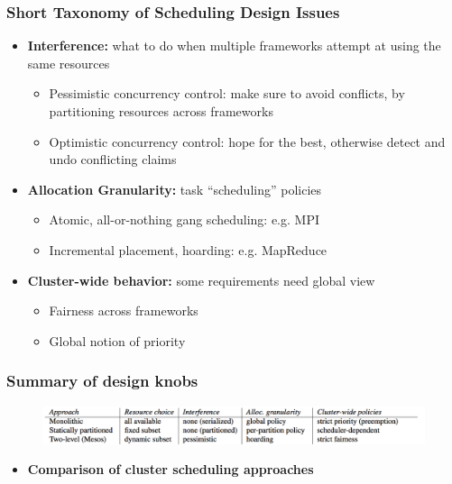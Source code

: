 \begin{frame}\frametitle{Short Taxonomy of Scheduling Design Issues}
\begin{itemize}
	\item {\bf Interference:} what to do when multiple frameworks attempt at using the same resources
	\begin{itemize}
		\item Pessimistic concurrency control: make sure to avoid conflicts, by partitioning resources across frameworks
		\item Optimistic concurrency control: hope for the best, otherwise detect and undo conflicting claims
	\end{itemize}

\vspace{20pt}

	\item {\bf Allocation Granularity: } task ``scheduling'' policies
	\begin{itemize}
		\item Atomic, all-or-nothing gang scheduling: e.g. MPI
		\item Incremental placement, hoarding: e.g. MapReduce
	\end{itemize}

\vspace{20pt}

	\item {\bf Cluster-wide behavior: } some requirements need global view
	\begin{itemize}
		\item Fairness across frameworks
		\item Global notion of priority
	\end{itemize}
\end{itemize}
\end{frame}

\begin{frame}\frametitle{Summary of design knobs}
\begin{figure}[h]
  \includegraphics[scale=0.28]{./figures/intro_design}
  \label{fig:intro_design}
\end{figure}
\begin{itemize}
	\item {\bf Comparison of cluster scheduling approaches}
\end{itemize}
\end{frame}

